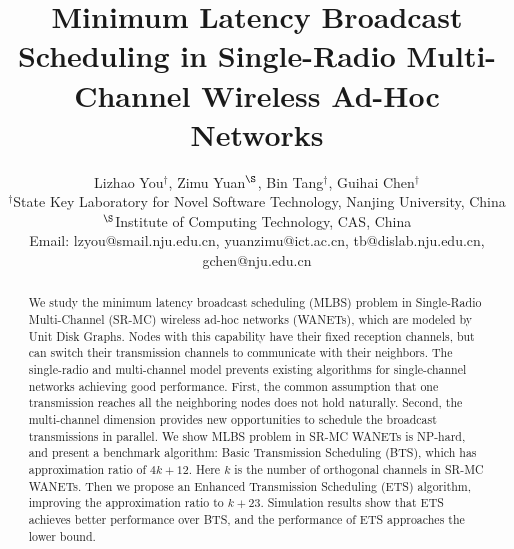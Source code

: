 \documentclass[10pt, conference]{IEEEtran}
\begin{document}
\title{Minimum Latency Broadcast Scheduling in Single-Radio Multi-Channel Wireless Ad-Hoc Networks}


\author{Lizhao You$^{\dagger}$, Zimu Yuan$^{\S}$, Bin Tang$^{\dagger}$, Guihai Chen$^{\dagger}$\\
$^{\dagger}$State Key Laboratory for Novel Software Technology, Nanjing University, China \\
$^{\S}$Institute of Computing Technology, CAS, China\\
Email: lzyou@smail.nju.edu.cn, yuanzimu@ict.ac.cn, tb@dislab.nju.edu.cn, gchen@nju.edu.cn\\
}













\maketitle


\begin{abstract}
We study the minimum latency broadcast scheduling (MLBS)
problem in Single-Radio Multi-Channel (SR-MC) wireless ad-hoc
networks (WANETs), which are modeled by Unit Disk Graphs. Nodes
with this capability have their fixed reception channels, but
can switch their transmission channels to communicate with
their neighbors. The single-radio and multi-channel model
prevents existing algorithms for single-channel networks
achieving good performance. First, the common assumption
that one transmission reaches all the neighboring nodes does
not hold naturally. Second, the multi-channel dimension
provides new opportunities to schedule the broadcast
transmissions in parallel. We show MLBS problem in SR-MC WANETs
is NP-hard, and present a benchmark algorithm: Basic
Transmission Scheduling (BTS), which has approximation ratio of
$4k+12$. Here $k$ is the number of orthogonal channels in SR-MC
WANETs. Then we propose an Enhanced Transmission Scheduling
(ETS) algorithm, improving the approximation ratio to $k+23$.
Simulation results show that ETS achieves better
performance over BTS, and the performance of ETS
approaches the lower bound.
\end{abstract}








\IEEEpeerreviewmaketitle
\end{document}
